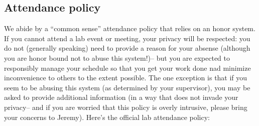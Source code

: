 \documentclass{tufte-book} %
\begin{document}
 \subsection{Attendance policy}
 We abide by a ``common sense'' attendance policy that relies on an
 honor system.  If you cannot attend a lab event or meeting, your
 privacy will be respected: you do not (generally speaking) need to
 provide a reason for your absense (although you are honor bound not
 to abuse this system!)-- but you are expected to responsibly manage
 your schedule so that you get your work done nad minimize
 inconvenience to others to the extent possible.  The one exception is
 that if you seem to be
 abusing this system (as determined by your supervisor), you may be
 asked to provide additional information (in a way that does not
 invade your privacy-- and if you are worried that this policy is overly
 intrusive, please bring your concerns to Jeremy).  Here's the official
 lab attendance policy:
\end{document}
